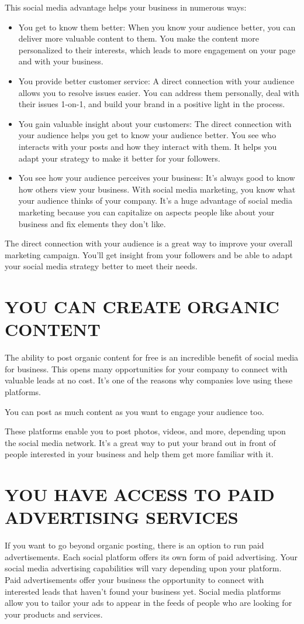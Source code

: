 \documentclass[a4paper]{article}
\begin{document}
This social media advantage helps your business in numerous ways:
 \begin{itemize}
    \item You get to know them better: When you know your audience better, you can deliver more valuable content to them. You make the content more personalized to their interests, which leads to more engagement on your page and with your business.
    \item You provide better customer service: A direct connection with your audience allows you to resolve issues easier. You can address them personally, deal with their issues 1-on-1, and build your brand in a positive light in the process.
    \item You gain valuable insight about your customers: The direct connection with your audience helps you get to know your audience better. You see who interacts with your posts and how they interact with them. It helps you adapt your strategy to make it better for your followers.
    \item You see how your audience perceives your business: It’s always good to know how others view your business. With social media marketing, you know what your audience thinks of your company. It’s a huge advantage of social media marketing because you can capitalize on aspects people like about your business and fix elements they don’t like.
  \end{itemize}
  The direct connection with your audience is a great way to improve your overall marketing campaign. You’ll get insight from your followers and be able to adapt your social media strategy better to meet their needs.
\lipsum[1]
  \newpage
  \section{ YOU CAN CREATE ORGANIC CONTENT}
The ability to post organic content for free is an incredible benefit of social media for business. This opens many opportunities for your company to connect with valuable leads at no cost. It’s one of the reasons why companies love using these platforms.

You can post as much content as you want to engage your audience too.

These platforms enable you to post photos, videos, and more, depending upon the social media network. It’s a great way to put your brand out in front of people interested in your business and help them get more familiar with it.
 
 
  \section{ YOU HAVE ACCESS TO PAID ADVERTISING SERVICES}
If you want to go beyond organic posting, there is an option to run paid advertisements. Each social platform offers its own form of paid advertising. Your social media advertising capabilities will vary depending upon your platform.
Paid advertisements offer your business the opportunity to connect with interested leads that haven’t found your business yet. Social media platforms allow you to tailor your ads to appear in the feeds of people who are looking for your products and services.
\end{document}
